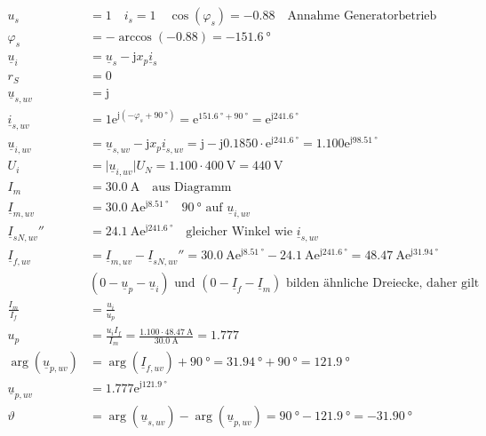 \documentclass[11pt,a4paper]{scrartcl}
\newcommand{\mybr}[1]{\left(#1\right)}
\renewcommand{\j}{\mathrm{j}}
\renewcommand{\u}{\underline{u}}
\newcommand{\I}{\underline{I}}
\renewcommand{\i}{\underline{i}}
\newcommand{\0}{_{\mybr{0}}}
\newcommand{\1}{_{\mybr{1}}}
\newcommand{\2}{_{\mybr{2}}}
\renewcommand{\e}{\mathrm{e}}
\begin{document}
\section{}
\begin{align}
u_s&=1\quad i_s=1\quad\cos\mybr{\varphi_s}=\num{-0.88}\quad\text{Annahme Generatorbetrieb}\\
\varphi_s&=-\arccos\mybr{\num{-0.88}}=\SI{-151.6}{\degree}\\
\u_i&=\u_s-\j x_p\i_s\\
r_S&=0\\
\u_{s,uv}&=\j\\
\i_{s,uv}&=1\e^{\j\mybr{-\varphi_s+\SI{90}{\degree}}}=\e^{\SI{151.6}{\degree}+\SI{90}{\degree}}=\e^{\j\SI{241.6}{\degree}}\\
\u_{i,uv}&=\u_{s,uv}-\j x_p \i_{s,uv}=\j-\j\num{0.1850}\cdot\e^{\j\SI{241.6}{\degree}}=\num{1.100}\e^{\j\SI{98.51}{\degree}}\\
U_i&=\vert\u_{i,uv}\vert U_N=\num{1.100}\cdot\SI{400}{\volt}=\SI{440}{\volt}\\
I_m&=\SI{30.0}{\ampere}\quad\text{aus Diagramm}\\
\I_{m,uv}&=\SI{30.0}{\ampere}\e^{\j\SI{8.51}{\degree}}\quad\text{$\SI{90}{\degree}$ auf $\u_{i,uv}$}\\
\I_{sN,uv}''&=\SI{24.1}{\ampere}\e^{\j\SI{241.6}{\degree}}\quad\text{gleicher Winkel wie $\i_{s,uv}$}\\
\I_{f,uv}&=\I_{m,uv}-\I_{sN,uv}''=\SI{30.0}{\ampere}\e^{\j\SI{8.51}{\degree}}-\SI{24.1}{\ampere}\e^{\j\SI{241.6}{\degree}}=\SI{48.47}{\ampere}\e^{\j\SI{31.94}{\degree}}\\
&\text{$\mybr{0-\u_p-\u_i}$ und $\mybr{0-\I_f-\I_m}$ bilden ähnliche Dreiecke, daher gilt}\nonumber\\
\frac{I_m}{I_f}&=\frac{u_i}{u_p}\\
u_p&=\frac{u_i I_f}{I_m}=\frac{\num{1.100}\cdot\SI{48.47}{\ampere}}{\SI{30.0}{\ampere}}=\num{1.777}\\
\arg\mybr{\u_{p,uv}}&=\arg\mybr{\I_{f,uv}}+\SI{90}{\degree}=\SI{31.94}{\degree}+\SI{90}{\degree}=\SI{121.9}{\degree}\\
\u_{p,uv}&=\num{1.777}\e^{\j\SI{121.9}{\degree}}\\
\vartheta&=\arg\mybr{\u_{s,uv}}-\arg\mybr{\u_{p,uv}}=\SI{90}{\degree}-\SI{121.9}{\degree}=\SI{-31.90}{\degree}
\end{align}
\end{document}
